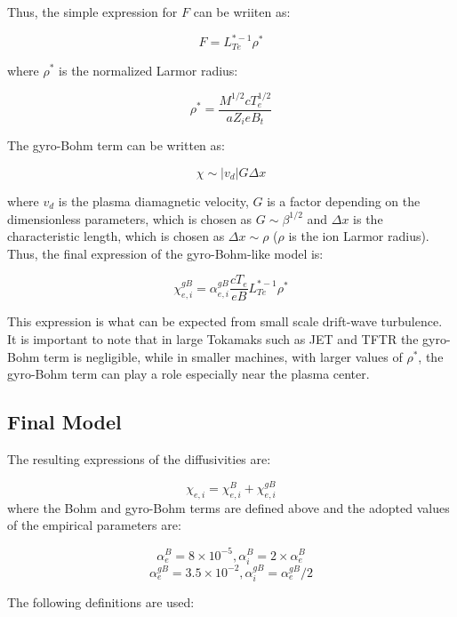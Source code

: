 \documentclass{article}    %
\begin{document}
Thus, the simple expression for $F$ can be wriiten as:\hfill 

\[ F = L_{Te}^{*-1} \rho^*\]

where $\rho^*$ is the normalized Larmor radius:\hfill

\[ \rho^* =  \frac {M^{1/2}cT_e^{1/2}}{aZ_ieB_t}\]

The gyro-Bohm term can be written as:\hfill

\[ \chi \sim |v_{d}| G \Delta x \]

where $v_{d}$ is the plasma diamagnetic velocity, $G$ is a factor depending on 
the dimensionless parameters, which is chosen as $G \sim \beta^{1/2}$ and $\Delta x$ is the 
characteristic length, which is chosen as $\Delta x \sim \rho$ ($\rho$ is the ion Larmor radius). 
Thus, the final expression of the gyro-Bohm-like model is:\hfill 

\[ \chi_{e,i}^{gB} = \alpha_{e,i}^{gB} \frac{cT_e}{eB} L_{Te}^{*-1} \rho^*\]

This expression is what can be expected from small scale
drift-wave turbulence.  It is important to note that in large
Tokamaks such as JET and TFTR the gyro-Bohm term is negligible,
while in smaller machines, with larger values of $\rho^*$, the
gyro-Bohm term can play a role especially near the plasma center.\hfill 

\subsection{Final Model}
The resulting expressions of the diffusivities are:

\[ \chi_{e,i}=\chi_{e,i}^{B}+\chi_{e,i}^{gB}\]
where the Bohm and gyro-Bohm terms are defined above and the adopted values
of the empirical parameters are:\hfill

\[ \alpha_{e}^{B} = 8\times10^{-5}, \alpha_{i}^{B} = 2\times\alpha_{e}^{B} \]
\[ \alpha_{e}^{gB} = 3.5\times10^{-2}, \alpha_{i}^{gB} = \alpha_{e}^{gB}/2 \]
\vskip8pt
\newpage

The following definitions are used:\vskip8pt
\end{document}
